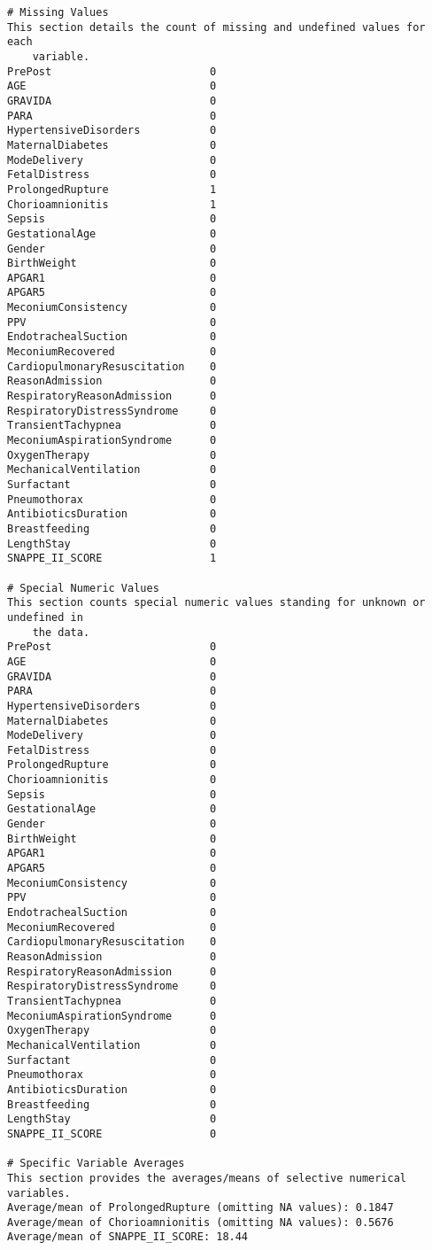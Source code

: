 \documentclass[11pt]{article}
\begin{document}
\begin{Verbatim}[tabsize=4]
# Missing Values
This section details the count of missing and undefined values for each
	variable.
PrePost                         0
AGE                             0
GRAVIDA                         0
PARA                            0
HypertensiveDisorders           0
MaternalDiabetes                0
ModeDelivery                    0
FetalDistress                   0
ProlongedRupture                1
Chorioamnionitis                1
Sepsis                          0
GestationalAge                  0
Gender                          0
BirthWeight                     0
APGAR1                          0
APGAR5                          0
MeconiumConsistency             0
PPV                             0
EndotrachealSuction             0
MeconiumRecovered               0
CardiopulmonaryResuscitation    0
ReasonAdmission                 0
RespiratoryReasonAdmission      0
RespiratoryDistressSyndrome     0
TransientTachypnea              0
MeconiumAspirationSyndrome      0
OxygenTherapy                   0
MechanicalVentilation           0
Surfactant                      0
Pneumothorax                    0
AntibioticsDuration             0
Breastfeeding                   0
LengthStay                      0
SNAPPE_II_SCORE                 1

# Special Numeric Values
This section counts special numeric values standing for unknown or undefined in
	the data.
PrePost                         0
AGE                             0
GRAVIDA                         0
PARA                            0
HypertensiveDisorders           0
MaternalDiabetes                0
ModeDelivery                    0
FetalDistress                   0
ProlongedRupture                0
Chorioamnionitis                0
Sepsis                          0
GestationalAge                  0
Gender                          0
BirthWeight                     0
APGAR1                          0
APGAR5                          0
MeconiumConsistency             0
PPV                             0
EndotrachealSuction             0
MeconiumRecovered               0
CardiopulmonaryResuscitation    0
ReasonAdmission                 0
RespiratoryReasonAdmission      0
RespiratoryDistressSyndrome     0
TransientTachypnea              0
MeconiumAspirationSyndrome      0
OxygenTherapy                   0
MechanicalVentilation           0
Surfactant                      0
Pneumothorax                    0
AntibioticsDuration             0
Breastfeeding                   0
LengthStay                      0
SNAPPE_II_SCORE                 0

# Specific Variable Averages
This section provides the averages/means of selective numerical variables.
Average/mean of ProlongedRupture (omitting NA values): 0.1847
Average/mean of Chorioamnionitis (omitting NA values): 0.5676
Average/mean of SNAPPE_II_SCORE: 18.44

\end{Verbatim}
\end{document}
